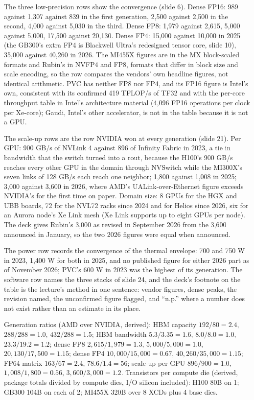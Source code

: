 \documentclass[11pt,letterpaper]{article}
\newenvironment{formulas}{\begin{tcolorbox}[formulabox]}{\end{tcolorbox}}
\begin{document}
The three low-precision rows show the convergence (slide 6). Dense FP16: 989 against 1,307 against 839 in the first generation, 2,500 against 2,500 in the second, 4,000 against 5,030 in the third. Dense FP8: 1,979 against 2,615, 5,000 against 5,000, 17,500 against 20,130. Dense FP4: 15,000 against 10,000 in 2025 (the GB300's extra FP4 is Blackwell Ultra's redesigned tensor core, slide 10), 35,000 against 40,260 in 2026. The MI455X figures are in the MX block-scaled formats and Rubin's in NVFP4 and FP8, formats that differ in block size and scale encoding, so the row compares the vendors' own headline figures, not identical arithmetic. PVC has neither FP8 nor FP4, and its FP16 figure is Intel's own, consistent with its confirmed 419 TFLOP/s of TF32 and with the per-core throughput table in Intel's architecture material (4,096 FP16 operations per clock per Xe-core); Gaudi, Intel's other accelerator, is not in the table because it is not a GPU.

The scale-up rows are the row NVIDIA won at every generation (slide 21). Per GPU: 900 GB/s of NVLink 4 against 896 of Infinity Fabric in 2023, a tie in bandwidth that the switch turned into a rout, because the H100's 900 GB/s reaches every other GPU in the domain through NVSwitch while the MI300X's seven links of 128 GB/s each reach one neighbor; 1,800 against 1,008 in 2025; 3,000 against 3,600 in 2026, where AMD's UALink-over-Ethernet figure exceeds NVIDIA's for the first time on paper. Domain size: 8 GPUs for the HGX and UBB boards, 72 for the NVL72 racks since 2024 and for Helios since 2026, six for an Aurora node's Xe Link mesh (Xe Link supports up to eight GPUs per node). The deck gives Rubin's 3,000 as revised in September 2026 from the 3,600 announced in January, so the two 2026 figures were equal when announced.

The power row records the convergence of the thermal envelope: 700 and 750 W in 2023, 1,400 W for both in 2025, and no published figure for either 2026 part as of November 2026; PVC's 600 W in 2023 was the highest of its generation. The software row names the three stacks of slide 24, and the deck's footnote on the table is the lecture's method in one sentence: vendor figures, dense peaks, the revision named, the unconfirmed figure flagged, and ``n.p.'' where a number does not exist rather than an estimate in its place.

\begin{formulas}
Generation ratios (AMD over NVIDIA, derived): HBM capacity $192/80 = 2.4$, $288/288 = 1.0$, $432/288 = 1.5$; HBM bandwidth $5.3/3.35 = 1.6$, $8.0/8.0 = 1.0$, $23.3/19.2 = 1.2$; dense FP8 $2{,}615/1{,}979 = 1.3$, $5{,}000/5{,}000 = 1.0$, $20{,}130/17{,}500 = 1.15$; dense FP4 $10{,}000/15{,}000 = 0.67$, $40{,}260/35{,}000 = 1.15$; FP64 matrix $163/67 = 2.4$, $78.6/1.4 = 56$; scale-up per GPU $896/900 = 1.0$, $1{,}008/1{,}800 = 0.56$, $3{,}600/3{,}000 = 1.2$. Transistors per compute die (derived, package totals divided by compute dies, I/O silicon included): H100 80B on 1; GB300 104B on each of 2; MI455X 320B over 8 XCDs plus 4 base dies.
\end{formulas}
\end{document}
